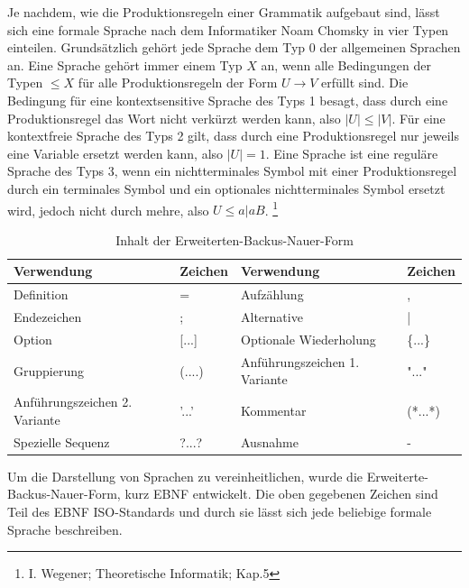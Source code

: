 Je nachdem, wie die Produktionsregeln einer Grammatik aufgebaut sind, lässt sich eine formale Sprache nach dem Informatiker Noam Chomsky in vier Typen einteilen. 
Grundsätzlich gehört jede Sprache dem Typ 0 der allgemeinen Sprachen an. 
Eine Sprache gehört immer einem Typ $X$ an, wenn alle Bedingungen  der Typen $\leq X$ für alle Produktionsregeln der Form $U \rightarrow V$ erfüllt sind. 
Die Bedingung für eine kontextsensitive Sprache des Typs 1 besagt, dass durch eine Produktionsregel das Wort nicht verkürzt werden kann, also $|U| \leq |V|$. 
Für eine kontextfreie Sprache des Typs 2 gilt, dass durch eine Produktionsregel nur jeweils eine Variable ersetzt werden kann, also $|U| = 1$. 
Eine Sprache ist eine reguläre Sprache des Typs 3, wenn ein nichtterminales Symbol mit einer Produktionsregel durch ein terminales Symbol und ein optionales nichtterminales Symbol ersetzt wird, jedoch nicht durch mehre, also $U \leq a|aB$. \footnote{I. Wegener;	Theoretische Informatik; Kap.5}\\
\begin{table}[h!]
\centering
\begin{tabular}{|ll|ll|}
\hline
Verwendung                    & Zeichen   & Verwendung                    & Zeichen \\ \hline
Definition                    & =         & Aufzählung                    & ,       \\
Endezeichen                   & ;         & Alternative                   & |       \\
Option                        & {[}...{]} & Optionale Wiederholung        & \{...\} \\
Gruppierung                   & (....)    & Anführungszeichen 1. Variante & "..."   \\
Anführungszeichen 2. Variante & '...'     & Kommentar                      & (*...*) \\
Spezielle Sequenz             & ?...?     & Ausnahme                      & -       \\ \hline
\end{tabular}
\caption{Inhalt der Erweiterten-Backus-Nauer-Form}
\label{ebnf}
\end{table}
Um die Darstellung von Sprachen zu vereinheitlichen, wurde die Erweiterte-Backus-Nauer-Form, kurz EBNF entwickelt. 
Die oben gegebenen Zeichen sind Teil des EBNF ISO-Standards und durch sie lässt sich jede beliebige formale Sprache beschreiben.\\
 
